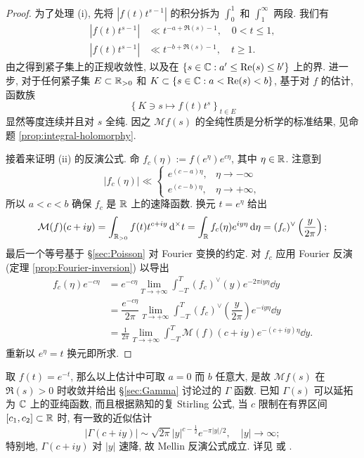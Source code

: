\begin{proof}
	为了处理 (i), 先将 $\left| f(t)t^{s-1} \right|$ 的积分拆为 $\int_0^1$ 和 $\int_1^\infty$ 两段.	我们有
	\begin{align*}
		|f(t) t^{s-1}| & \ll t^{-a + \Re(s) - 1}, \quad 0 < t \leq 1, \\
		|f(t) t^{s-1}| & \ll t^{-b + \Re(s) - 1}, \quad t \geq 1.
	\end{align*}
	由之得到紧子集上的正规收敛性, 以及在 $\left\{ s \in \mathbb{C} : a' \leq \operatorname{Re}(s) \leq b' \right\}$ 上的界. 进一步, 对于任何紧子集 $E \subset \mathbb{R}_{>0}$ 和 $K \subset \{s \in \mathbb{C}: a < \operatorname{Re}(s) < b \}$, 基于对 $f$ 的估计, 函数族
	\[ \left\{ K \ni s \mapsto f(t) t^s \right\}_{t \in E} \]
	显然等度连续并且对 $s$ 全纯. 因之 $\mathcal{M}f(s)$ 的全纯性质是分析学的标准结果, 见命题 \ref{prop:integral-holomorphy}.
	
	接着来证明 (ii) 的反演公式. 命 $f_c(\eta) := f(e^\eta) e^{c\eta}$, 其中 $\eta \in \mathbb{R}$. 注意到
	\[ |f_c(\eta)| \ll \begin{cases}
		e^{(c-a)\eta}, & \eta \to -\infty \\
		e^{(c-b)\eta}, & \eta \to +\infty,
	\end{cases}\]
	所以 $a < c < b$ 确保 $f_c$ 是 $\mathbb{R}$ 上的速降函数. 换元 $t = e^\eta$ 给出
	\[ \mathcal{M}(f)(c + iy) = \int_{\mathbb{R}_{>0}} f(t) t^{c + iy} \mathop{}\!\mathrm{d}^\times t = \int_{\mathbb{R}} f_c(\eta) e^{iy\eta} \mathop{}\!\mathrm{d}\eta = (f_c)^\vee\left( \dfrac{y}{2\pi} \right); \]
	最后一个等号基于 \S\ref{sec:Poisson} 对 Fourier 变换的约定. 对 $f_c$ 应用 Fourier 反演 (定理 \ref{prop:Fourier-inversion}) 以导出
	\begin{align*}
		f_c(\eta) e^{-c\eta} & = e^{-c\eta} \lim_{T \to +\infty} \int_{-T}^T (f_c)^\vee(y) e^{-2\pi iy\eta} \dd y \\
		& = \dfrac{e^{-c\eta}}{2\pi} \lim_{T \to +\infty} \int_{-T}^T (f_c)^\vee\left( \dfrac{y}{2\pi} \right) e^{-iy\eta} \dd y \\
		& = \frac{1}{2\pi} \lim_{T \to +\infty} \int_{-T}^T \mathcal{M}(f)(c+iy) e^{-(c+iy)\eta} \dd y.
	\end{align*}
	重新以 $e^\eta = t$ 换元即所求.
\end{proof}

\begin{example}\label{eg:Gamma-Mellin}
	取 $f(t) = e^{-t}$, 那么以上估计中可取 $a=0$ 而 $b$ 任意大, 是故 $\mathcal{M}f(s)$ 在 $\Re(s) > 0$ 时收敛并给出 \S\ref{sec:Gamma} 讨论过的 $\Gamma$ 函数. 已知 $\Gamma(s)$ 可以延拓为 $\mathbb{C}$ 上的亚纯函数, 而且根据熟知的复 Stirling 公式, 当 $c$ 限制在有界区间 $[c_1, c_2] \subset \mathbb{R}$ 时, 有一致的近似估计
	\begin{equation}\label{eqn:Gamma-vertical}
		|\Gamma(c+iy)| \sim \sqrt{2\pi} |y|^{c - \frac{1}{2}} e^{-\pi|y|/2}, \quad |y| \to \infty;
	\end{equation}
	特别地, $\Gamma(c + iy)$ 对 $|y|$ 速降, 故 Mellin 反演公式成立. 详见 \cite[3.12]{GW} 或 \cite[II.0.4]{Ten11}.
\end{example}


